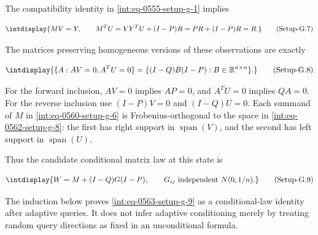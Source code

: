 
The compatibility identity in \hyperref[int:eq-setup-g-1]{\eqref{int:eq-0555-setup-g-1}} implies


\label{int:eq-setup-g-7}
\begingroup\renewcommand{\theHequation}{intdisplay.1062}
\begin{equation}
\intdisplay{
MV=Y,\qquad
 M^TU=VY^TU+(I-P)R=PR+(I-P)R=R.
}
\tag{Setup-G.7}
\label{int:eq-0561-setup-g-7}
\end{equation}
\endgroup


The matrices preserving homogeneous versions of these observations are exactly


\label{int:eq-setup-g-8}
\begingroup\renewcommand{\theHequation}{intdisplay.1063}
\begin{equation}
\intdisplay{
\{A:AV=0, A^TU=0\}
 =\{(I-Q)B(I-P):B\in\mathbb R^{n\times n}\}.
}
\tag{Setup-G.8}
\label{int:eq-0562-setup-g-8}
\end{equation}
\endgroup


For the forward inclusion, \(AV=0\) implies \(AP=0\), and \(A^TU=0\) implies \(QA=0\). For the reverse inclusion use \((I-P)V=0\) and \((I-Q)U=0\). Each summand of \(M\) in \hyperref[int:eq-setup-g-6]{\eqref{int:eq-0560-setup-g-6}} is Frobenius-orthogonal to the space in \hyperref[int:eq-setup-g-8]{\eqref{int:eq-0562-setup-g-8}}: the first has right support in \(\operatorname{span}(V)\), and the second has left support in \(\operatorname{span}(U)\).



Thus the candidate conditional matrix law at this state is


\label{int:eq-setup-g-9}
\begingroup\renewcommand{\theHequation}{intdisplay.1064}
\begin{equation}
\intdisplay{
W=M+(I-Q)G(I-P),
 \qquad G_{ij}\ \text{independent }N(0,1/n).
}
\tag{Setup-G.9}
\label{int:eq-0563-setup-g-9}
\end{equation}
\endgroup


The induction below proves \hyperref[int:eq-setup-g-9]{\eqref{int:eq-0563-setup-g-9}} as a conditional-law identity after adaptive queries. It does not infer adaptive conditioning merely by treating random query directions as fixed in an unconditional formula.


